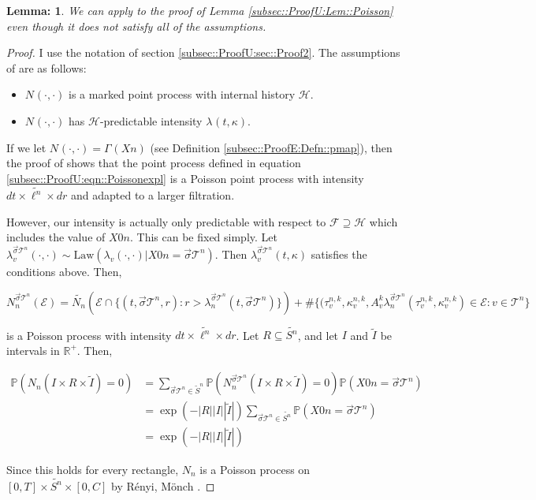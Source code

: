 \documentclass[12pt]{article}
\newcommand{\mb}{\mathbb}
\newcommand{\mc}{\mathcal}
\newcommand{\te}{\text}
\newcommand{\ind}{\hspace{24pt}}
\newcommand{\pr}{\mb{P}}							%
\renewcommand{\v}{v}							%
\renewcommand{\S}{S}							%
\newcommand{\s}{\sigma}							%
\newcommand{\sv}{\vec{\s}}						%
\renewcommand{\t}{t}							%
\newcommand{\X}{X}								%
\newcommand{\const}{C}							%
\newcommand{\tree}{\mc{T}}						%
\newcommand{\sln}[1]{^{#1}}						%
\newcommand{\poiss}[1]{N_{#1}}						%
\newcommand{\law}{\te{Law}}							%
\renewcommand{\r}{r}								%
\newcommand{\rt}[1]{\tau^{#1}}						%
\renewcommand{\it}{k}								%
\newcommand{\XState}[1]{\S^{#1}}				%
\newcommand{\rate}[1]{\lambda_{#1}}					%
\newcommand{\Sm}{\ell}								%
\newcommand{\alt}{\widetilde}						%
\newcommand{\rv}{A}								%
\newcommand{\evnt}{\mc{E}}						%
\renewcommand{\mark}[1]{\kappa^{#1}}				%
\newcommand{\pmap}[1]{\Gamma_{#1}}				%
\newcommand{\inte}{I}							%
\newtheorem{lem}[thms]{Lemma: }
\begin{document}
\begin{lem}
We can apply \cite[Proposition 14.7.I(b)]{DalVer08} to the proof of Lemma \ref{subsec::ProofU:Lem::Poisson} even though it does not satisfy all of the assumptions.
\label{sec::TL:Lem::embedding}
\end{lem}
\begin{proof}
I use the notation of section \ref{subsec::ProofU:sec::Proof2}. The assumptions of \cite[Proposition 14.7.I(b)]{DalVer08} are as follows:

\begin{itemize}
\item \(\poiss{}(\cdot,\cdot)\) is a marked point process with internal history \(\mc{H}\).

\item \(\poiss{}(\cdot,\cdot)\) has \(\mc{H}\)-predictable intensity \(\rate{}(\t,\kappa)\).
\end{itemize}

If we let \(\poiss{}(\cdot,\cdot) = \pmap{}(\X{}{}{n})\) (see Definition \ref{subsec::ProofE:Defn::pmap}), then the proof of \cite[Proposition 14.7.I(b)]{DalVer08} shows that the point process defined in equation \eqref{subsec::ProofU:eqn::Poissonexpl} is a Poisson point process with intensity \(d\t\times \alt{\Sm^n}\times d\r\) and adapted to a larger filtration.

\ind However, our intensity is actually only predictable with respect to \(\mc{F} \supseteq \mc{H}\) which includes the value of \(\X{}{0}{n}\). This can be fixed simply. Let \(\rate{\v}^{\sv{}{\tree\sln{n}}}(\cdot,\cdot) \sim \law(\rate{\v}(\cdot,\cdot)|\X{}{0}{n} = \sv{}{\tree\sln{n}})\). Then \(\rate{\v}^{\sv{}{\tree\sln{n}}}(t,\kappa)\) satisfies the conditions above. Then,

\[\poiss{n}^{\sv{}{\tree\sln{n}}}(\evnt) = \alt{\poiss{n}}\left(\evnt\cap\{(t,\sv{}{\tree\sln{n}},\r):\r > \rate{n}^{\sv{}{\tree\sln{n}}}(\t,\sv{}{\tree\sln{n}})\}\right) + \#\{(\rt{n,\it}_\v,\mark{n,\it}_\v,\rv_{\v}^{\it}\rate{n}^{\sv{}{\tree\sln{n}}}(\rt{n,\it}_\v,\mark{n,\it}_\v) \in \evnt: \v\in \tree\sln{n}\}\]

is a Poisson process with intensity \(d\t\times \alt{\Sm^n}\times d\r\). Let \(R \subseteq \alt{\S^n}\), and let \(\inte\) and \(\alt{\inte}\) be intervals in \(\mb{R}^+\). Then,

\begin{align*}
\pr\left(\poiss{n}\left(\inte\times R\times \alt{\inte}\right) = 0\right) &= \sum_{\sv{}{\tree\sln{n}} \in \alt{S}^n} \pr\left(\poiss{n}^{\sv{}{\tree\sln{n}}}\left(\inte\times R\times \alt{\inte}\right) = 0\right)\pr(\X{}{0}{n} = \sv{}{\tree\sln{n}})\\
&= \exp\left(-|R| |\inte||\alt{\inte}|\right)\sum_{\sv{}{\tree\sln{n}} \in \alt{S^n}} \pr(\X{}{0}{n} = \sv{}{\tree\sln{n}})\\
&=\exp\left(-|R| |\inte||\alt{\inte}|\right)
\end{align*}

Since this holds for every rectangle, \(\poiss{n}\) is a Poisson process on \([0,T]\times \alt{\S^n}\times [0,\const{}]\) by R\'enyi, M\"onch \cite[Theorem 9.2.XII]{DalVer08}.



\end{proof}
\newpage


\end{document}

